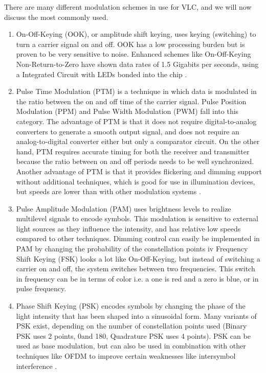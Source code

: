 There are many different modulation schemes in use for VLC, and we will now
discuss the most commonly used.

\begin{enumerate}

\item On-Off-Keying (OOK), or amplitude shift keying, uses keying (switching) to
turn a carrier signal on and off. OOK has a low processing burden but is
proven to be very sensitive to noise. Enhanced schemes like On-Off-Keying
Non-Return-to-Zero have shown data rates of 1.5 Gigabits per seconds,
using a Integrated Circuit with LEDs bonded into the chip \citep{ook-450}.

\item Pulse Time Modulation (PTM) is a technique in which data is modulated
in the ratio between the on and off time of the carrier signal. Pulse Position
Modulation (PPM) and Pulse Width Modulation (PWM) fall into this
category. The advantage of PTM is that it does not require digital-to-analog
converters to generate a smooth output signal, and does not require an
analog-to-digital converter either but only a comparator circuit. On the other
hand, PTM requires accurate timing for both the receiver and transmitter
because the ratio between on and off periods needs to be well synchronized.
Another advantage of PTM is that it provides flickering and dimming
support without additional techniques, which is good for use in illumination
devices, but speeds are lower than with other modulation systems \citep{ppm}.


\item  Pulse Amplitude Modulation (PAM) uses brightness levels to realize multilevel
signals to encode symbols. This modulation is sensitive to external
light sources as they influence the intensity, and has relative low speeds
compared to other techniques. Dimming control can easily be implemented
in PAM by changing the probability of the constellation points \citep{diming}
iv Frequency Shift Keying (FSK) looks a lot like On-Off-Keying, but instead of
switching a carrier on and off, the system switches between two frequencies.
This switch in frequency can be in terms of color i.e. a one is red and
a zero is blue, or in pulse frequency.

\item Phase Shift Keying (PSK) encodes symbols by changing the phase of the
light intensity that has been shaped into a sinusoidal form. Many variants
of PSK exist, depending on the number of constellation points used (Binary
PSK uses 2 points, 0\textdegree  and 180\textdegree, Quadrature PSK uses 4 points). PSK
can be used as base modulation, but can also be used in combination
with other techniques like OFDM to improve certain weaknesses like intersymbol
interference \citep{ofdm-plc}.


\end{enumerate}
